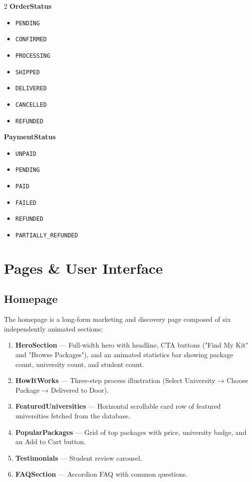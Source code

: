 \documentclass[12pt, a4paper]{article}
\begin{document}
\begin{multicols}{2}
\textbf{OrderStatus}
\begin{itemize}[noitemsep]
  \item \texttt{PENDING}
  \item \texttt{CONFIRMED}
  \item \texttt{PROCESSING}
  \item \texttt{SHIPPED}
  \item \texttt{DELIVERED}
  \item \texttt{CANCELLED}
  \item \texttt{REFUNDED}
\end{itemize}

\columnbreak

\textbf{PaymentStatus}
\begin{itemize}[noitemsep]
  \item \texttt{UNPAID}
  \item \texttt{PENDING}
  \item \texttt{PAID}
  \item \texttt{FAILED}
  \item \texttt{REFUNDED}
  \item \texttt{PARTIALLY\_REFUNDED}
\end{itemize}
\end{multicols}

\section{Pages \& User Interface}

\subsection{Homepage}

The homepage is a long-form marketing and discovery page composed of six independently animated sections:

\begin{enumerate}[leftmargin=*]
  \item \textbf{HeroSection} — Full-width hero with headline, CTA buttons ("Find My Kit" and "Browse Packages"), and an animated statistics bar showing package count, university count, and student count.
  \item \textbf{HowItWorks} — Three-step process illustration (Select University → Choose Package → Delivered to Door).
  \item \textbf{FeaturedUniversities} — Horizontal scrollable card row of featured universities fetched from the database.
  \item \textbf{PopularPackages} — Grid of top packages with price, university badge, and an Add to Cart button.
  \item \textbf{Testimonials} — Student review carousel.
  \item \textbf{FAQSection} — Accordion FAQ with common questions.
\end{enumerate}
\end{document}
